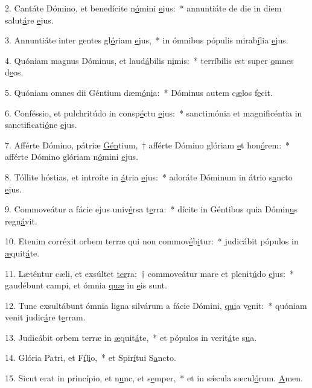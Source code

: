 2. Cantáte Dómino, et benedícite n\uline{ó}mini \uline{e}jus:~* annuntiáte de die in diem salut\uline{á}re \uline{e}jus.\par 
3. Annuntiáte inter gentes gl\uline{ó}riam \uline{e}jus,~* in ómnibus pópulis mirab\uline{í}lia \uline{e}jus.\par 
4. Quóniam magnus Dóminus, et laud\uline{á}bilis n\uline{i}mis:~* terríbilis est super \uline{o}mnes d\uline{e}os.\par 
5. Quóniam omnes dii Géntium dæm\uline{ó}n\uline{i}a:~* Dóminus autem c\uline{æ}los f\uline{e}cit.\par 
6. Conféssio, et pulchritúdo in consp\uline{é}ctu \uline{e}jus:~* sanctimónia et magnificéntia in sanctificati\uline{ó}ne \uline{e}jus.\par 
7. Afférte Dómino, pátriæ \uline{Gén}tium,~† afférte Dómino glóriam \uline{e}t hon\uline{ó}rem:~* afférte Dómino glóriam n\uline{ó}mini \uline{e}jus.\par 
8. Tóllite hóstias, et introíte in \uline{á}tria \uline{e}jus:~* adoráte Dóminum in átrio s\uline{a}ncto \uline{e}jus.\par 
9. Commoveátur a fácie ejus univ\uline{é}rsa t\uline{e}rra:~* dícite in Géntibus quia Dómin\uline{u}s regn\uline{á}vit.\par 
10. Etenim corréxit orbem terræ qui non commov\uline{é}b\uline{i}tur:~* judicábit pópulos in \uline{æ}quit\uline{á}te.\par 
11. Læténtur cæli, et exsúltet \uline{ter}ra:~† commoveátur mare et plenit\uline{ú}do \uline{e}jus:~* gaudébunt campi, et ómnia \uline{quæ} in \uline{e}is sunt.\par 
12. Tunc exsultábunt ómnia ligna silvárum a fácie Dómini, \uline{qui}a v\uline{e}nit:~* quóniam venit judic\uline{á}re t\uline{e}rram.\par 
13. Judicábit orbem terræ in \uline{æ}quit\uline{á}te,~* et pópulos in verit\uline{á}te s\uline{u}a.\par 
14. Glória Patri, et F\uline{í}l\uline{i}o,~* et Spir\uline{í}tui S\uline{a}ncto.\par 
15. Sicut erat in princípio, et n\uline{u}nc, et s\uline{e}mper,~* et in sǽcula sæcul\uline{ó}rum. \uline{A}men.\par 
